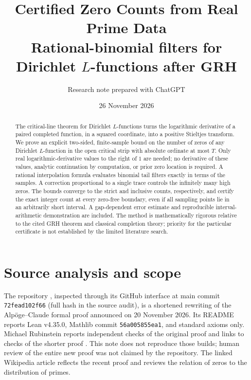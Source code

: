 \documentclass[11pt]{article}
\title{Certified Zero Counts from Real Prime Data\\[3pt]\large Rational-binomial filters for Dirichlet $L$-functions after GRH}
\author{Research note prepared with ChatGPT}
\date{26 November 2026}
\theoremstyle{remark}\newtheorem{remark}[theorem]{Remark}
\begin{document}
\maketitle
\begin{abstract}
The critical-line theorem for Dirichlet $L$-functions turns the logarithmic derivative of a paired completed function, in a squared coordinate, into a positive Stieltjes transform. We prove an explicit two-sided, finite-sample bound on the number of zeros of any Dirichlet $L$-function in the open critical strip with absolute ordinate at most $T$. Only real logarithmic-derivative values to the right of $1$ are needed; no derivative of these values, analytic continuation by computation, or prior zero location is required. A rational interpolation formula evaluates binomial tail filters exactly in terms of the samples. A correction proportional to a single trace controls the infinitely many high zeros. The bounds converge to the strict and inclusive counts, respectively, and certify the exact integer count at every zero-free boundary, even if all sampling points lie in an arbitrarily short interval. A gap-dependent error estimate and reproducible interval-arithmetic demonstration are included. The method is mathematically rigorous relative to the cited GRH theorem and classical completion theory; priority for the particular certificate is not established by the limited literature search.
\end{abstract}

\section{Source analysis and scope}
The repository \cite{repo}, inspected through its GitHub interface at main commit \texttt{72fead102f66} (full hash in the source audit), is a shortened rewriting of the Alp\"oge--Claude formal proof announced on 20 November 2026. Its README reports Lean v4.35.0, Mathlib commit \texttt{56a005855ea1}, and standard axioms only. Michael Rubinstein reports independent checks of the original proof and links to checks of the shorter proof \cite{rubinstein}. This note does not reproduce those builds; human review of the entire new proof was not claimed by the repository. The linked Wikipedia article \cite{wiki} reflects the recent proof and reviews the relation of zeros to the distribution of primes.
\end{document}
